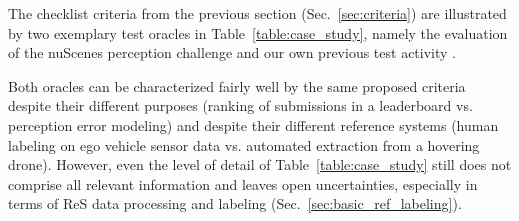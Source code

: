 \documentclass[conference]{IEEEtran}
\begin{document}
The checklist criteria from the previous section (Sec.~\ref{sec:criteria}) are illustrated by two exemplary test oracles in Table~\ref{table:case_study}, namely the evaluation of the nuScenes perception challenge \cite{caesar2019nuscenes} and our own previous test activity \cite{Krajewski2020UsingDrones}. 


Both oracles can be characterized fairly well by the same proposed criteria despite their different purposes (ranking of submissions in a leaderboard vs. perception error modeling) and despite their different reference systems (human labeling on ego vehicle sensor data vs. automated extraction from a hovering drone).
However, even the level of detail of Table~\ref{table:case_study} still does not comprise all relevant information and leaves open uncertainties, especially in terms of ReS data processing and labeling (Sec.~\ref{sec:basic_ref_labeling}).









\newcommand{\scenariosDrone}{Ego vehicle statically observes an urban intersection from a sidewalk.}
\newcommand{\outDrone}{Single lidar sensor with integrated object detection and tracking}
\newcommand{\furtherDrone}{Modeling of how OuT deviates from ReS regarding TP object states}

\newcommand{\scenariosChallenge}{Ego vehicle dynamically participates in various urban traffic scenarios.}
\newcommand{\furtherChallenge}{Computation of metrics such as AMOTA and AMOTP \cite{weng2019baseline} for the online leaderboard}
\newcommand{\outChallenge}{Submitted detection and tracking algorithms that operate on either camera-only, lidar-only, or all raw sensor data}
\end{document}
